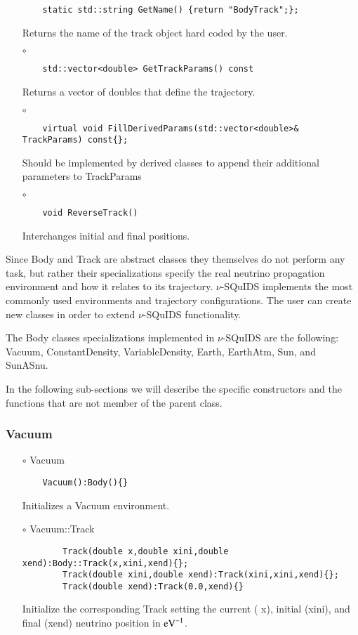 \begin{itemize}
\begin{lstlisting}
    static std::string GetName() {return "BodyTrack";};
  \end{lstlisting}
  Returns the name of the track object hard coded by the user. 
\item[$\circ$]  
  \begin{lstlisting}
    std::vector<double> GetTrackParams() const 
  \end{lstlisting}           
  Returns a vector of doubles that define the trajectory.
\item[$\circ$] 
   \begin{lstlisting}
    virtual void FillDerivedParams(std::vector<double>& TrackParams) const{};
  \end{lstlisting}           
  Should be implemented by derived classes to append their
  additional parameters to TrackParams
  
\item[$\circ$] 
  \begin{lstlisting}
    void ReverseTrack() 
  \end{lstlisting}
  Interchanges initial and final positions.
\end{itemize}


Since {\ttf Body} and {\ttf Track} are abstract classes they themselves do not perform any task, but rather their specializations specify the real neutrino propagation environment and how it relates to its trajectory. $\nu$-SQuIDS implements the most commonly used environments and trajectory configurations. The user can create new classes in order to extend $\nu$-SQuIDS functionality.

The {\ttf Body} classes specializations implemented in $\nu$-SQuIDS
are the following: {\ttf Vacuum}, {\ttf ConstantDensity}, {\ttf
  VariableDensity}, {\ttf Earth}, {\ttf EarthAtm}, {\ttf Sun}, and {\ttf SunASnu}.

In the following sub-sections we will describe the specific
constructors and the functions that are not member of the parent class.

\subsubsection{Vacuum}

\begin{itemize}
\item[$\circ$] {\ttf Vacuum}
  \begin{lstlisting}
    Vacuum():Body(){}
  \end{lstlisting}
  Initializes a {\ttf Vacuum} environment. 
\item[$\circ$] {\ttf Vacuum::Track}
  \begin{lstlisting}
        Track(double x,double xini,double xend):Body::Track(x,xini,xend){};
        Track(double xini,double xend):Track(xini,xini,xend){};
        Track(double xend):Track(0.0,xend){}
  \end{lstlisting}
  Initialize the corresponding {\ttf Track} setting the current ({\ttf
  x}), initial ({\ttf xini}), and final ({\ttf xend}) neutrino position in ${\rm eV}^{-1}$.
\end{itemize}

